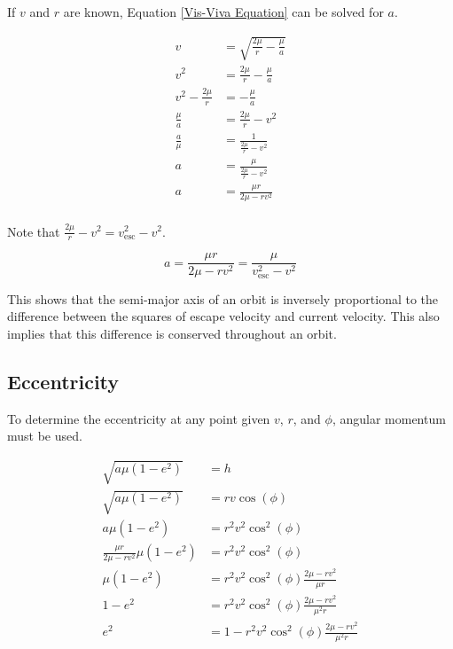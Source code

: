 \documentclass{article}
\begin{document}
If $v$ and $r$ are known, Equation \eqref{Vis-Viva Equation} can be solved for $a$.

\begin{align*}
    v                  & = \sqrt{\frac{2\mu}{r}-\frac{\mu}{a}} \\
    v^2                & = \frac{2\mu}{r}-\frac{\mu}{a}        \\
    v^2-\frac{2\mu}{r} & =-\frac{\mu}{a}                       \\
    \frac{\mu}{a}      & = \frac{2\mu}{r}-v^2                  \\
    \frac{a}{\mu}      & = \frac{1}{\frac{2\mu}{r}-v^2}        \\
    a                  & = \frac{\mu}{\frac{2\mu}{r}-v^2}      \\
    a                  & = \frac{\mu r}{2\mu-rv^2}             \\
\end{align*}

Note that $\frac{2\mu}{r}-v^2=v_\text{esc}^2-v^2$.

\begin{equation}\label{SMA in terms of r, v}
    a=\frac{\mu r}{2\mu-rv^2}=\frac{\mu}{v_\text{esc}^2-v^2}
\end{equation}

This shows that the semi-major axis of an orbit is inversely proportional to the difference between the squares of escape velocity and current velocity. This also implies that this difference is conserved throughout an orbit.

\bigskip\bigskip
\subsection{Eccentricity}\label{sec:Eccentricity in Terms of V,R}

To determine the eccentricity at any point given $v$, $r$, and $\phi$, angular momentum must be used.

\begin{align*}
    \sqrt{a\mu(1-e^2)}                & =h                                            \\
    \sqrt{a\mu(1-e^2)}                & =rv\cos(\phi)                                 \\
    a\mu(1-e^2)                       & =r^2v^2\cos^2(\phi)                           \\
    \frac{\mu r}{2\mu-rv^2}\mu(1-e^2) & =r^2v^2\cos^2(\phi)                           \\
    \mu(1-e^2)                        & =r^2v^2\cos^2(\phi)\frac{2\mu-rv^2}{\mu r}    \\
    1-e^2                             & =r^2v^2\cos^2(\phi)\frac{2\mu-rv^2}{\mu^2r}   \\
    e^2                               & =1-r^2v^2\cos^2(\phi)\frac{2\mu-rv^2}{\mu^2r} \\
\end{align*}
\end{document}
